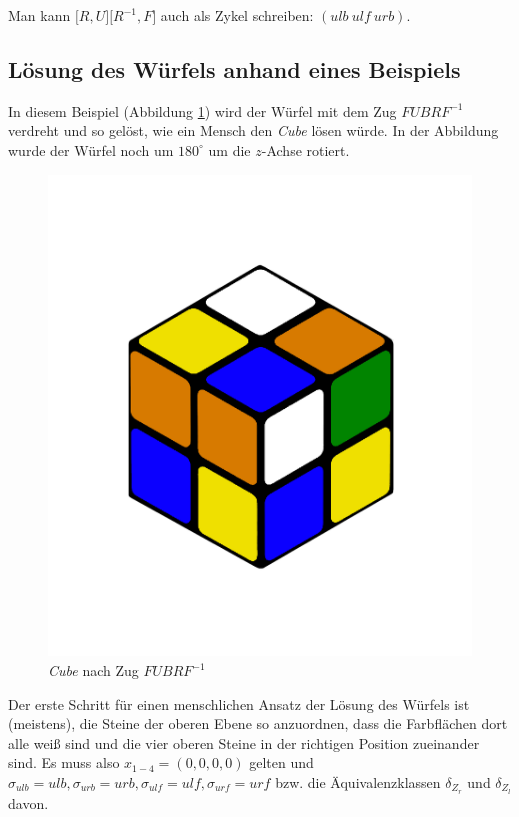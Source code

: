 \documentclass[12pt,a4paper, usenames, dvipsnames]{article}
\theoremstyle{mystyle}
\theoremstyle{definition}
\begin{document}
Man kann $\lbrack R, U \rbrack \lbrack R^{-1}, F \rbrack$ auch als Zykel schreiben: $(ulb \ ulf \ urb)$. 
%
%
%
%
%
%
%
%
%
%
%
%
%
%
%
%
%
%
%
%
\subsection*{Lösung des Würfels anhand eines Beispiels}

In diesem Beispiel (Abbildung \ref{18}) wird der Würfel mit dem Zug $FUBRF^{-1}$ verdreht und so gelöst, wie ein Mensch den \textit{Cube} lösen würde.
In der Abbildung wurde der Würfel noch um $180^\circ$ um die $z$-Achse rotiert.

\begin{figure}[H]
\centering
\includegraphics[scale=0.12]{LURFL1.png}
\caption{\textit{Cube} nach Zug $FUBRF^{-1}$ }
\label{18}
\end{figure}

Der erste Schritt für einen menschlichen Ansatz der Lösung des Würfels ist (meistens), die Steine der oberen Ebene so anzuordnen, dass die Farbflächen dort alle weiß sind und die vier oberen Steine in der richtigen Position zueinander sind. 
Es muss also $x_{1-4} = (0,0,0,0)$ gelten und $\sigma_{ulb}=ulb, \sigma_{urb} = urb, \sigma_{ulf} = ulf, \sigma_{urf}=urf$ bzw. die Äquivalenzklassen $\delta_{Z_r}$ und $\delta_{Z_l}$ davon. 
\end{document}
